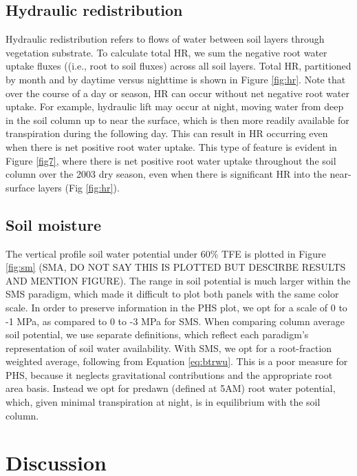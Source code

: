 \documentclass[draft,linenumbers]{agujournal}
\begin{document}
        
\subsection{Hydraulic redistribution}
    Hydraulic redistribution refers to flows of water between soil layers through vegetation substrate.
    To calculate total HR, we sum the negative root water uptake fluxes ((i.e., root to soil fluxes) across all soil layers.
    Total HR, partitioned by month and by daytime versus nighttime is shown in Figure \ref{fig:hr}.
    Note that over the course of a day or season, HR can occur without net negative root water uptake.
    For example, hydraulic lift may occur at night, moving water from deep in the soil column up to near the surface, which is then more readily available for transpiration during the following day.  This can 
    result in HR occurring even when there is net positive root water uptake.
    This type of feature is evident in Figure \ref{fig7}, where there is net positive root water uptake throughout the soil column over the 2003 dry season, even when there is significant HR into the near-surface layers (Fig \ref{fig:hr}).

\subsection{Soil moisture}
    The vertical profile soil water potential under 60\% TFE is plotted in Figure \ref{fig:sm} (SMA, DO NOT SAY THIS IS PLOTTED BUT DESCIRBE RESULTS AND MENTION FIGURE).
    The range in soil potential is much larger within the SMS paradigm, which made it difficult to plot both panels with the same color scale.
    In order to preserve information in the PHS plot, we opt for a scale of 0 to -1 MPa, as compared to 0 to -3 MPa for SMS.
    When comparing column average soil potential, we use separate definitions, which reflect each paradigm's representation of soil water availability.
    With SMS, we opt for a root-fraction weighted average, following from Equation \ref{eq:btrwu}.
    This is a poor measure for PHS, because it neglects gravitational contributions and the appropriate root area basis. 
    Instead we opt for predawn (defined at 5AM) root water potential, which, given minimal transpiration at night, is in equilibrium with the soil column. 
    
\section{Discussion}
\end{document}
